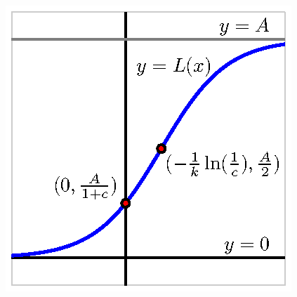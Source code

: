 \begin{activitySolution}
  \begin{center}
  	\includegraphics{figures/3_2_Act3Soln.eps}
  \end{center}
	 \ea
\end{activitySolution}
\aftera
















